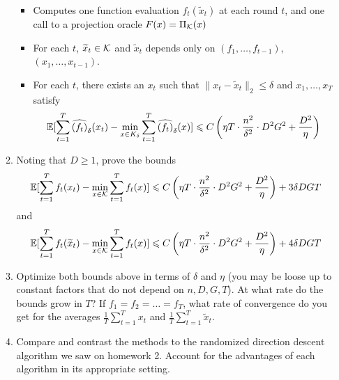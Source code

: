 \documentclass[12pt]{article}
\begin{document}
\begin{enumerate}
\begin{enumerate}
			\begin{itemize}
			\item Computes one function evaluation $f_t(\widetilde{x}_t)$ at each round $t$, and one call to a projection oracle $F(x) = \Pi_{{\cal K}}(x)$
			\item For each $t$, $\widetilde{x}_t \in {\cal K}$ and $\widetilde{x}_t$ depends only on $(f_1,\dots,f_{t-1})$, $(x_1,\dots,x_{t-1})$. 
			\item For each $t$, there exists an $x_t$ such that $\|x_t - \widetilde{x}_t\|_2 \le \delta$ and $x_1,\dots,x_T$ satisfy 
			\begin{eqnarray}
		\mathbb{E}[\sum_{t=1}^T \widehat{(f_t)}_{\delta}(x_t) - \min_{x \in K_{\delta}} \sum_{t=1}^T \widehat{(f_t)}_{\delta}(x)] \leqslant C\left(\eta T \cdot \frac{n^2}{\delta^2} \cdot D^2 G^2 + \frac{D^2}{\eta}\right)
		\end{eqnarray}
		\end{itemize} 
		\item Noting that $D \ge 1$, prove the bounds
		\begin{eqnarray}
		\mathbb{E}[\sum_{t=1}^T f_{t}(x_t) - \min_{x \in {\cal K}} \sum_{t=1}^T f_t(x)] \leqslant C\left(\eta T \cdot \frac{n^2}{\delta^2} \cdot D^2 G^2 + \frac{D^2}{\eta}\right) + 3 \delta DGT
		\end{eqnarray}
		and 
		\begin{eqnarray}
		\mathbb{E}[\sum_{t=1}^T f_{t}(\widetilde{x}_t) - \min_{x \in {\cal K}} \sum_{t=1}^T f_t(x)] \leqslant C\left(\eta T \cdot \frac{n^2}{\delta^2} \cdot D^2 G^2 + \frac{D^2}{\eta}\right) + 4 \delta DGT
		\end{eqnarray}
		\item Optimize both bounds above in terms of $\delta$ and $\eta$ (you may be loose up to constant factors that do not depend on $n, D,G, T$). At what rate do the bounds grow in $T$? If $f_1 = f_2 = \dots = f_T$, what rate of convergence do you get for the averages $\frac{1}{T}\sum_{t=1}^Tx_t$ and $\frac{1}{T}\sum_{t=1}^T\widetilde{x}_t$.
		\item Compare and contrast the methods to the randomized direction descent algorithm we saw on homework 2. Account for the advantages of each algorithm in its appropriate setting. 
		\end{enumerate}
	\end{enumerate}
\end{document}
